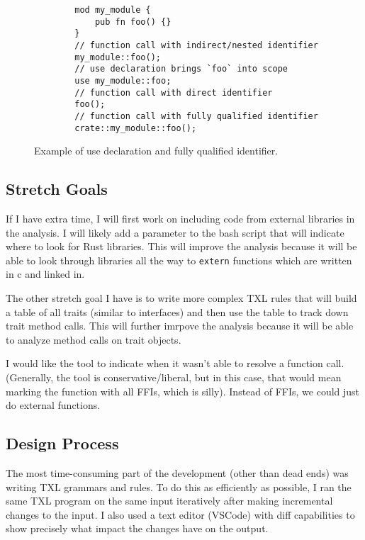 \documentclass[11pt]{article}
\begin{document}


\begin{figure}
    \caption{Example of use declaration and fully qualified identifier.}
    \label{fig:qualifiers}
    \begin{lstlisting}
        mod my_module {
            pub fn foo() {}
        }
        // function call with indirect/nested identifier
        my_module::foo();
        // use declaration brings `foo` into scope
        use my_module::foo;
        // function call with direct identifier
        foo();
        // function call with fully qualified identifier
        crate::my_module::foo();
    \end{lstlisting}
\end{figure}

\subsection{Stretch Goals}
If I have extra time, I will first work on including code from external libraries in the analysis.
I will likely add a parameter to the bash script that will indicate where to look for Rust libraries.
This will improve the analysis because it will be able to look through libraries all the way to \lstinline{extern} functions which are written in c and linked in.

The other stretch goal I have is to write more complex TXL rules that will build a table of all traits (similar to interfaces) and then use the table to track down trait method calls.
This will further imrpove the analysis because it will be able to analyze method calls on trait objects.

I would like the tool to indicate when it wasn't able to resolve a function call.
(Generally, the tool is conservative/liberal, but in this case, that would mean marking the function with all FFIs, which is silly).
Instead of FFIs, we could just do external functions.

\subsection{Design Process}
The most time-consuming part of the development (other than dead ends) was writing TXL grammars and rules.
To do this as efficiently as possible, I ran the same TXL program on the same input iteratively after making incremental changes to the input.
I also used a text editor (VSCode) with diff capabilities to show precisely what impact the changes have on the output.
\end{document}
